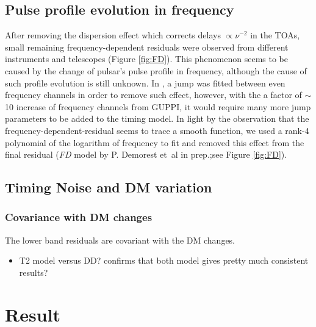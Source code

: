 \subsection{Pulse profile evolution in frequency}
\label{sec:pfev}
After removing the dispersion effect which corrects delays $\propto \nu^{-2}$
in the TOAs, small remaining frequency-dependent residuals were observed from
different instruments and telescopes (Figure \ref{fig:FD}).  
This phenomenon seems to be caused by the change of pulsar's pulse profile in
frequency, although the cause of such profile evolution is still unknown.
In \citet{sns+05}, a jump was fitted between even frequency channels in order to remove such effect, however, with the a factor of $\sim$10 increase of frequency channels from GUPPI, it would require many more jump parameters to be added to the timing model.
In light by the observation that the frequency-dependent-residual seems to
trace a smooth function, we used a rank-4 polynomial of the logarithm of
frequency to fit and removed this effect from the final residual ({\it FD}
model by P. Demorest et~al in prep.;see Figure \ref{fig:FD}). 



\subsection{Timing Noise and DM variation}

\subsubsection{Covariance with DM changes}
The lower band residuals are covariant with the DM changes.


\begin{itemize}
\item T2 model versus DD? confirms that both model gives pretty much consistent results?
\end{itemize}

\section{Result}

